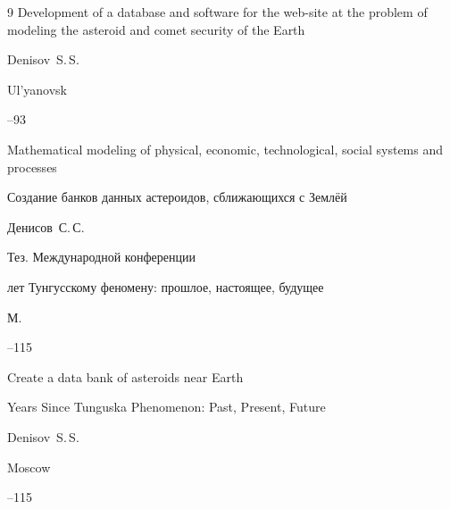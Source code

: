\begin{thebibliography}{9}
\paper Development of a database and software for the web-site at the problem of modeling the asteroid and comet security of the Earth

\by Denisov~S.\,S.

\publaddr Ul'yanovsk


--93

\inbook Mathematical modeling of physical, economic, technological, social systems and processes




\paper Создание банков данных астероидов, сближающихся с Землёй

\by Денисов~С.\,С.

\bookinfo  Тез. Международной конференции

 лет Тунгусскому феномену: прошлое, настоящее, будущее

\publaddr М.


--115

\misctransl 

\paper Create a data bank of asteroids near Earth

 Years Since Tunguska Phenomenon: Past, Present,  Future 

\by Denisov~S.\,S.

\publaddr Moscow


--115





\end{thebibliography}



\noindent

\hskip6.5cm \thedate \par\noindent

\hskip6.5cm\therevdate





\newpage 








\makeengtitlem



\newpage



%

